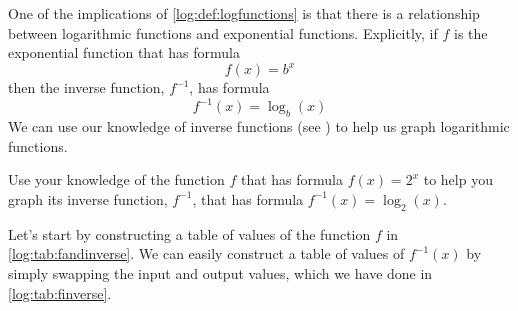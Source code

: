 One of the implications of \cref{log:def:logfunctions} is that there is 
a relationship between logarithmic functions and exponential functions. 
Explicitly, if $f$ is the exponential function that has formula
\[
	f(x)=b^x
\]
then the inverse function, $f^{-1}$, has formula
\[
	f^{-1}(x)=\log_b(x)
\]
We can use our knowledge of inverse functions (see ) to help us graph logarithmic functions.

\begin{pccexample}[Graphing]\label{log:ex:graphing}
	Use your knowledge of the function $f$ that has formula $f(x)=2^x$ 
	to help you graph its inverse function, $f^{-1}$, that has formula
	$f^{-1}(x)=\log_2(x)$.
	\begin{pccsolution}
		Let's start by constructing a table of values of the function $f$ in 
		\cref{log:tab:fandinverse}. We can easily construct a table of 
		values of $f^{-1}(x)$ by simply swapping the input and output values, 
		which we have done in \cref{log:tab:finverse}.
		

\end{pccsolution}
\end{pccexample}

